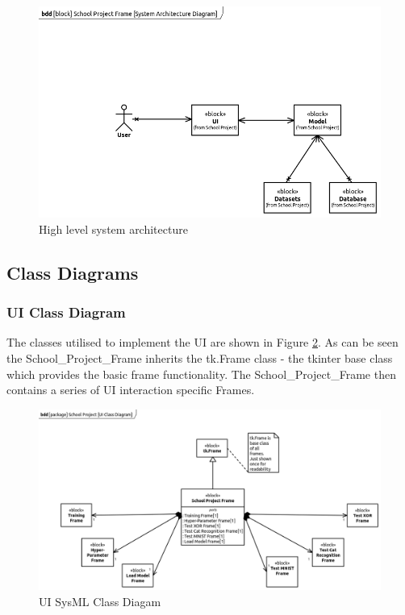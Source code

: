 \documentclass[./project-report/src/latex/project-report.tex]{subfiles}
\begin{document}
\begin{figure}[h!]
\centering
\includegraphics[width=1\textwidth]{./project-report/src/images/system-architecture-diagram.png}
\caption{High level system architecture}
\label{fig:system-architecture}
\end{figure}

\pagebreak

\subsection{Class Diagrams}

\subsubsection{UI Class Diagram}
\label{UI-class-diagram}
The classes utilised to implement the UI are shown in Figure \ref{fig:UI-class-diagram}. As can be seen the School\_Project\_Frame inherits the tk.Frame class - the tkinter 
base class which provides the basic frame functionality. The School\_Project\_Frame then contains a series of UI interaction specific Frames.

\begin{figure}[h!]
\centering
\includegraphics[width=1\textwidth]{./project-report/src/images/ui-class-diagram.png}
\caption{UI SysML Class Diagam}
\label{fig:UI-class-diagram}
\end{figure}
\end{document}
